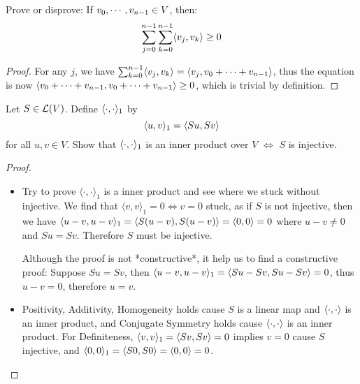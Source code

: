 \documentclass[../main.tex]{subfiles}
\begin{document}
\setcounter{section}{6}


\begin{exercise}
  Prove or disprove: If $\join{v}{n - 1} \in V$, then:
  \[
  \sum_{j = 0}^{n - 1}\sum_{k = 0}^{n - 1} \ip{v_j}{v_k} \ge 0
  \]
\end{exercise}
\begin{proof}
  For any $j$, we have $\sum_{k = 0}^{n - 1} \ip{v_j}{v_k} = \ip{v_j}{\join[+]{v}{n - 1}}$,
  thus the equation is now $\ip{\join[+]{v}{n - 1}}{\join[+]{v}{n - 1}} \ge 0$,
  which is trivial by definition.
\end{proof}

\begin{exercise}
  Let $S \in \LT(V)$. Define $\ip{\cdot}{\cdot}_1$ by
  \[
  \ip{u}{v}_1 = \ip{Su}{Sv}
  \]
  for all $u, v \in V$.
  Show that $\ip{\cdot}{\cdot}_1$ is an inner product over $V$
  $\iff$ $S$ is injective.
\end{exercise}
\begin{proof}
  ~
  \begin{itemize}
    \item Try to prove $\langle \cdot, \cdot \rangle_1$ is a inner product and see where we stuck without injective.
          We find that $\langle v, v \rangle_1 = 0 \iff v = 0$ stuck, as if
          $S$ is not injective, then we have $\ip{u - v}{u - v}_1 = \ip{S(u - v)}{S(u - v)} = \ip{0}{0} = 0$
          where $u - v \neq 0$ and $Su = Sv$.
          Therefore $S$ must be injective.

          Although the proof is not *constructive*, it help us to find a constructive proof:
          Suppose $Su = Sv$, then $\ip{u - v}{u - v}_1 = \ip{Su - Sv}{Su - Sv} = 0$, thus $u - v = 0$, therefore $u = v$.
    \item Positivity, Additivity, Homogeneity holds cause $S$ is a linear map and $\ip{\cdot}{\cdot}$ is an inner product,
          and Conjugate Symmetry holds cause $\ip{\cdot}{\cdot}$ is an inner product.
          For Definiteness, $\ip{v}{v}_1 = \ip{Sv}{Sv} = 0$ implies $v = 0$ cause $S$ injective,
          and $\ip{0}{0}_1 = \ip{S0}{S0} = \ip{0}{0} = 0$.
  \end{itemize}
\end{proof}
\end{document}
